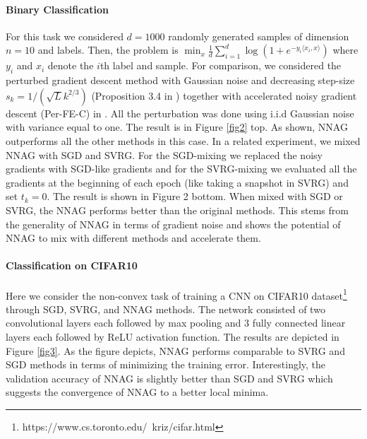 \documentclass{article}
\theoremstyle{plain}
\theoremstyle{definition}
\theoremstyle{remark}
\begin{document}
\paragraph{Binary Classification}
For this task we considered \(d=1000\) randomly generated samples of dimension \(n=10\) and labels. Then, the problem is \(\min_x \tfrac{1}{d}\sum_{i=1}^d \log(1+e^{-y_i\langle x_i,x \rangle})\) where \(y_i\) and \(x_i\) denote the \(i\)th label and sample. For comparison, we considered the perturbed gradient descent method with Gaussian noise and decreasing step-size \(s_k=1/(\sqrt{L}k^{2/3})\) (Proposition 3.4 in \citep{pmlr-v108-laborde20a}) together with accelerated noisy gradient descent (Per-FE-C) in \citep{pmlr-v108-laborde20a}. All the perturbation was done using i.i.d Gaussian noise with variance equal to one. The result is in Figure \ref{fig2} top. As shown, NNAG outperforms all the other methods in this case. In a related experiment, we mixed NNAG with SGD and SVRG. For the SGD-mixing we replaced the noisy gradients with SGD-like gradients and for the SVRG-mixing we evaluated all the gradients at the beginning of each epoch (like taking a snapshot in SVRG) and set \(t_k=0\). The result is shown in Figure 2 bottom. When mixed with SGD or SVRG, the NNAG performs better than the original methods. This stems from the generality of NNAG in terms of gradient noise and shows the potential of NNAG to mix with different methods and accelerate them.
\paragraph{Classification on CIFAR10}
Here we consider the non-convex task of training a CNN on CIFAR10 dataset\footnote{https://www.cs.toronto.edu/~kriz/cifar.html} through SGD, SVRG, and NNAG methods. The network consisted of two convolutional layers each followed by max pooling and 3 fully connected linear layers each followed by ReLU activation function. The results are depicted in Figure \ref{fig3}. As the figure depicts, NNAG performs comparable to SVRG and SGD methods in terms of minimizing the training error. Interestingly, the validation accuracy of NNAG is slightly better than SGD and SVRG which suggests the convergence of NNAG to a better local minima. 
\end{document}
